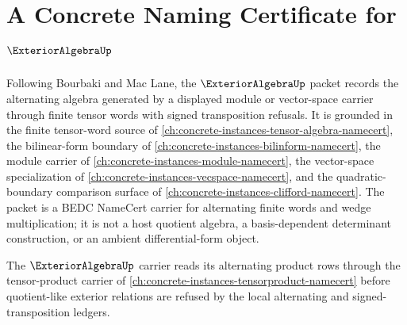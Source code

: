 \chapter{A Concrete Naming Certificate for $\ExteriorAlgebraUp$}
\label{ch:concrete-instances-exterior-algebra-namecert}

Following Bourbaki and Mac Lane, the $\ExteriorAlgebraUp$ packet records the alternating algebra generated by a displayed module or vector-space carrier through finite tensor words with signed transposition refusals. It is grounded in the finite tensor-word source of \autoref{ch:concrete-instances-tensor-algebra-namecert}, the bilinear-form boundary of \autoref{ch:concrete-instances-bilinform-namecert}, the module carrier of \autoref{ch:concrete-instances-module-namecert}, the vector-space specialization of \autoref{ch:concrete-instances-vecspace-namecert}, and the quadratic-boundary comparison surface of \autoref{ch:concrete-instances-clifford-namecert}. The packet is a BEDC NameCert carrier for alternating finite words and wedge multiplication; it is not a host quotient algebra, a basis-dependent determinant construction, or an ambient differential-form object.

The $\ExteriorAlgebraUp$ carrier reads its alternating product rows through the tensor-product carrier of \autoref{ch:concrete-instances-tensorproduct-namecert} before quotient-like exterior relations are refused by the local alternating and signed-transposition ledgers.

